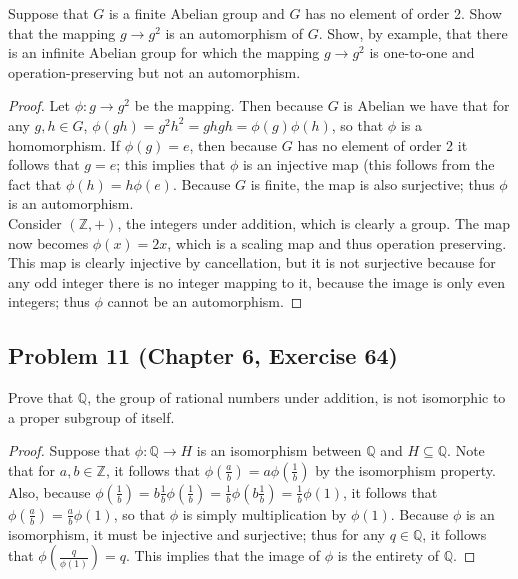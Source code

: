 \documentclass{article}
\begin{document}
Suppose that $G$ is a finite Abelian group and $G$ has no element of order 2. Show that the mapping $g \to g^2$ is an automorphism of $G$. Show, by example, that there is an infinite Abelian group for which the mapping $g \to g^2$ is one-to-one and operation-preserving but not an automorphism.

\begin{proof}

Let $\phi \colon g \to g^2$ be the mapping. Then because $G$ is Abelian we have that for any $g, h \in G$, $\phi(gh) = g^2h^2 = ghgh = \phi(g)\phi(h)$, so that $\phi$ is a homomorphism. If $\phi(g) = e$, then because $G$ has no element of order 2 it follows that $g = e$; this implies that $\phi$ is an injective map (this follows from the fact that $\phi(h) = h\phi(e)$. Because $G$ is finite, the map is also surjective; thus $\phi$ is an automorphism. \\
Consider $(\mathbb{Z}, +)$, the integers under addition, which is clearly a group. The map now becomes $\phi(x) = 2x$, which is a scaling map and thus operation preserving. This map is clearly injective by cancellation, but it is not surjective because for any odd integer there is no integer mapping to it, because the image is only even integers; thus $\phi$ cannot be an automorphism. 

\end{proof}

\subsection*{Problem 11 (Chapter 6, Exercise 64)}

Prove that $\mathbb{Q}$, the group of rational numbers under addition, is not isomorphic to a proper subgroup of itself.

\begin{proof}

Suppose that $\phi \colon \mathbb{Q} \to H$ is an isomorphism between $\mathbb{Q}$ and $H \subseteq \mathbb{Q}$. Note that for $a, b \in \mathbb{Z}$, it follows that $\phi(\frac{a}{b}) = a\phi(\frac{1}{b})$ by the isomorphism property. Also, because $\phi(\frac{1}{b}) = b\frac{1}{b}\phi(\frac{1}{b}) = \frac{1}{b}\phi(b\frac{1}{b}) = \frac{1}{b}\phi(1)$, it follows that $\phi(\frac{a}{b}) = \frac{a}{b}\phi(1)$, so that $\phi$ is simply multiplication by $\phi(1)$. Because $\phi$ is an isomorphism, it must be injective and surjective; thus for any $q \in \mathbb{Q}$, it follows that $\phi(\frac{q}{\phi(1)}) = q$. This implies that the image of $\phi$ is the entirety of $\mathbb{Q}$.

\end{proof}
\end{document}
